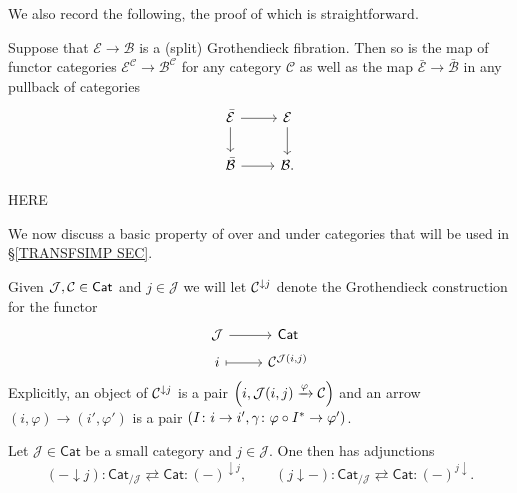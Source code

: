 \documentclass[a4paper,10pt]{article}%
\begin{document}
We also record the following, the proof of which is straightforward.
\begin{proposition}\label{GROTHSTAB PROP}
	Suppose that $\mathcal{E} \to \mathcal{B}$ is a (split) Grothendieck fibration. Then so is the map of functor categories 
	$\mathcal{E}^{\mathcal{C}} \to \mathcal{B}^{\mathcal{C}}$ for any category $\mathcal{C}$ as well as the map 
	$\bar{\mathcal{E}} \to \bar{\mathcal{B}}$ in any pullback of categories
\[
\begin{tikzcd}
	\bar{\mathcal{E}} \ar{r} \ar{d} & \mathcal{E} \ar{d}
\\
	\bar{\mathcal{B}} \ar{r} & \mathcal{B}.
\end{tikzcd}
\]	
\end{proposition}



{\color{red} HERE}



We now discuss a basic property of over and under categories that will be used in \S \ref{TRANSFSIMP SEC}.


Given $\mathcal{J},\mathcal{C} \in \mathsf{Cat}$ and $j \in \mathcal{J}$ we will let $\mathcal{C}^{ \downarrow j}$ denote the Grothendieck construction for the functor
\[
\begin{tikzcd}[row sep = 0.25em]
	\mathcal{J} \ar{r} & \mathsf{Cat} \\
	i \ar[mapsto]{r} & \C^{\mathcal{J}(i,j)}
\end{tikzcd}
\]
Explicitly, an object of $\mathcal{C}^{\downarrow j}$ is a pair
$\left(i,\mathcal{J}(i,j)\xrightarrow{\varphi} \mathcal{C}\right)$
and an arrow 
$(i,\varphi) \to (i',\varphi')$
is a pair
$(I \colon i \to i', 
\gamma \colon \varphi\circ I^{\**} \to \varphi')$.



\begin{lemma}\label{UNDERLEFTADJ LEM}
Let $\mathcal{J} \in \mathsf{Cat}$ be a small category and 
$j \in \mathcal{J}$. One then has adjunctions
\[
	(\minus \downarrow j) 
		\colon
	\mathsf{Cat}_{/\mathcal{J}}
		\rightleftarrows
	\mathsf{Cat}
		\colon
	(\minus)^{\downarrow j},
\qquad
	(j \downarrow \minus) 
		\colon
	\mathsf{Cat}_{/\mathcal{J}}
		\rightleftarrows
	\mathsf{Cat}
		\colon
	(\minus)^{j \downarrow}.
\]
\end{lemma}
\end{document}
